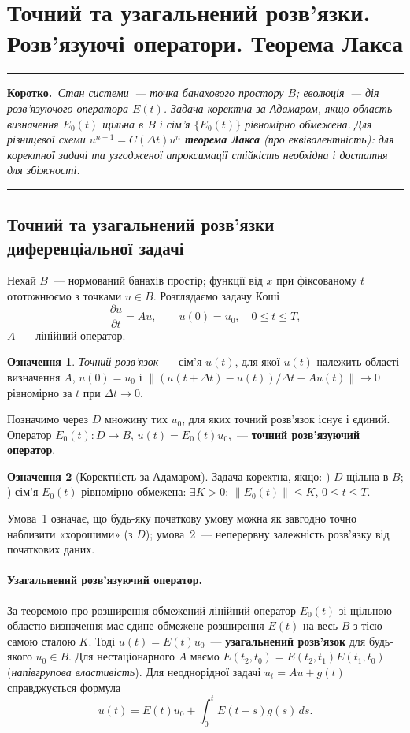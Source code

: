 \documentclass[12pt,a4paper]{article}
\theoremstyle{definition}
\newtheorem{ozn}{Означення}[section]
\theoremstyle{plain}
\newenvironment{korotko}
  {\par\medskip\noindent\begingroup\color{accent!75!black}\rule{\linewidth}{0.4pt}\par
   \noindent\textbf{Коротко.}\itshape\,}
  {\par\noindent\rule{\linewidth}{0.4pt}\endgroup\medskip}
\newcommand{\ddt}[1]{\dfrac{\partial #1}{\partial t}}
\newcommand{\norm}[1]{\left\lVert #1 \right\rVert}
\begin{document}
\newpage
\section{Точний та узагальнений розв'язки. Розв'язуючі оператори. Теорема Лакса}

\begin{korotko}
Стан системи~--- точка банахового простору $B$; еволюція~--- дія
\emph{розв'язуючого оператора} $E(t)$. Задача коректна за Адамаром, якщо
область визначення $E_0(t)$ щільна в $B$ і сім'я $\{E_0(t)\}$ рівномірно
обмежена. Для різницевої схеми $u^{n+1}=C(\Delta t)u^n$
\textbf{теорема Лакса} (про еквівалентність): для коректної задачі та
узгодженої апроксимації \emph{стійкість необхідна і достатня для
збіжності}.
\end{korotko}

\subsection{Точний та узагальнений розв'язки диференціальної задачі}
Нехай $B$~--- нормований банахів простір; функції від $x$ при фіксованому
$t$ ототожнюємо з точками $u\in B$. Розглядаємо задачу Коші
\begin{equation}
  \ddt{u}=Au,\qquad u(0)=u_0,\quad 0\le t\le T,
  \label{eq:cauchy}
\end{equation}
$A$~--- лінійний оператор.
\begin{ozn}
\emph{Точний розв'язок}~--- сім'я $u(t)$, для якої $u(t)$ належить
області визначення $A$, $u(0)=u_0$ і
$\big\|(u(t+\Delta t)-u(t))/\Delta t-Au(t)\big\|\to0$ рівномірно за $t$
при $\Delta t\to0$.
\end{ozn}
Позначимо через $D$ множину тих $u_0$, для яких точний розв'язок існує і
єдиний. Оператор $E_0(t):D\to B$, $u(t)=E_0(t)u_0$,~--- \textbf{точний
розв'язуючий оператор}.

\begin{ozn}[Коректність за Адамаром]
Задача коректна, якщо: ) $D$ щільна в $B$; ) сім'я $E_0(t)$
рівномірно обмежена: $\exists K>0$: $\norm{E_0(t)}\le K$, $0\le t\le T$.
\end{ozn}
Умова~1 означає, що будь-яку початкову умову можна як завгодно точно
наблизити «хорошими» (з $D$); умова~2~--- неперервну залежність
розв'язку від початкових даних.

\paragraph{Узагальнений розв'язуючий оператор.} За теоремою про
розширення обмежений лінійний оператор $E_0(t)$ зі щільною областю
визначення має єдине обмежене розширення $E(t)$ на весь $B$ з тією самою
сталою $K$. Тоді $u(t)=E(t)u_0$~--- \textbf{узагальнений розв'язок} для
будь-якого $u_0\in B$. Для нестаціонарного $A$ маємо
$E(t_2,t_0)=E(t_2,t_1)E(t_1,t_0)$ (\emph{напівгрупова властивість}).
Для неоднорідної задачі $u_t=Au+g(t)$ справджується формула
\begin{equation}
  u(t)=E(t)u_0+\int_0^t E(t-s)g(s)\,ds .
\end{equation}
\end{document}

